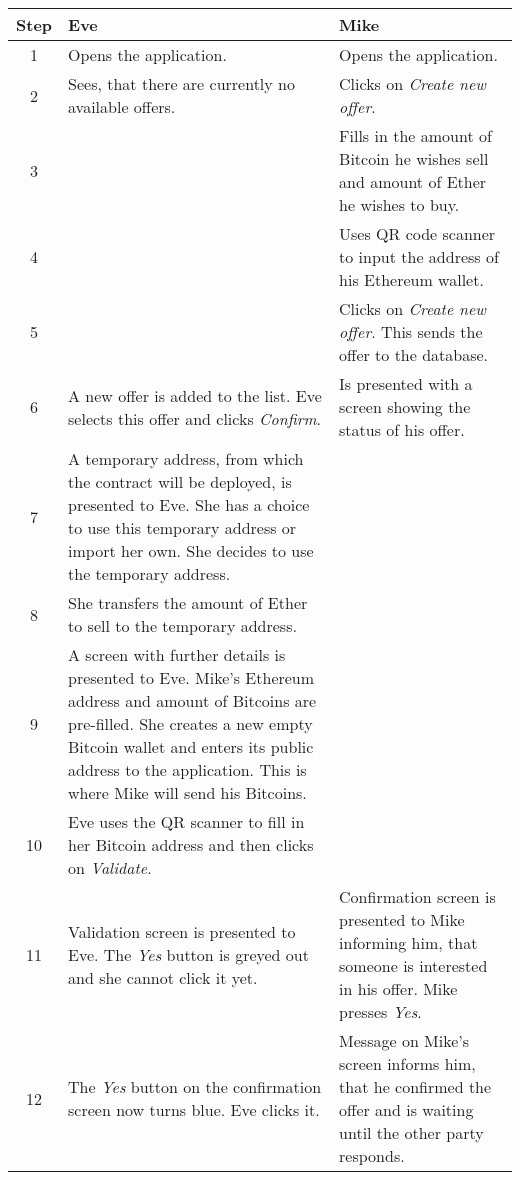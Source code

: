 \begin{table}[ht]
    \centering
    \begin{tabularx}{\textwidth}{|c|X|X|}
        \hline
        \textbf{Step}&\textbf{Eve}&\textbf{Mike}\\
        \hline
        1&Opens the application.&Opens the application.\\
        \hline
        2&Sees, that there are currently no available offers.&Clicks on \textit{Create new offer}.\\
        \hline
        3&&Fills in the amount of Bitcoin he wishes sell and amount of Ether he wishes to buy.\\
        \hline
        4&&Uses QR code scanner to input the address of his Ethereum wallet.\\
        \hline
        5&&Clicks on \textit{Create new offer}. This sends the offer to the database.\\
        \hline
        6&A new offer is added to the list. Eve selects this offer and clicks \textit{Confirm}.&Is presented with a screen showing the status of his offer.\\
        \hline
        7&A temporary address, from which the contract will be deployed, is presented to Eve. She has a choice to use this temporary address or import her own. She decides to use the temporary address.&\\
        \hline
        8&She transfers the amount of Ether to sell to the temporary address.&\\
        \hline
        9&A screen with further details is presented to Eve. Mike's Ethereum address and amount of Bitcoins are pre-filled. She creates a new empty Bitcoin wallet and enters its public address to the application. This is where Mike will send his Bitcoins.&\\
        \hline
        10&Eve uses the QR scanner to fill in her Bitcoin address and then clicks on \textit{Validate}.&\\
        \hline
        11&Validation screen is presented to Eve. The \textit{Yes} button is greyed out and she cannot click it yet.&Confirmation screen is presented to Mike informing him, that someone is interested in his offer. Mike presses \textit{Yes}.\\
        \hline
        12&The \textit{Yes} button on the confirmation screen now turns blue. Eve clicks it.&Message on Mike's screen informs him, that he confirmed the offer and is waiting until the other party responds.\\

\end{tabularx}
\end{table}

